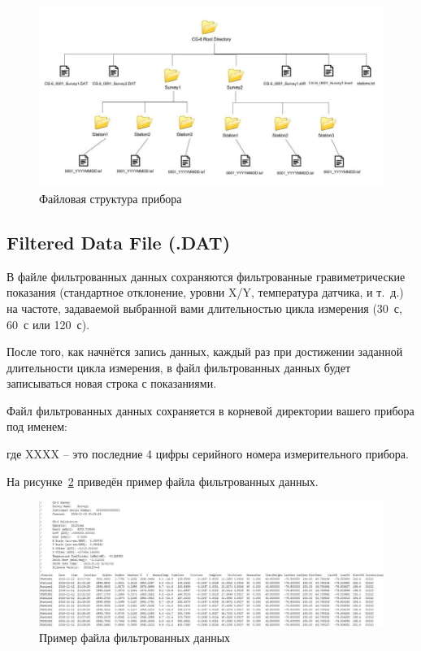 \begin{figure}[h]
  \centering
  \includegraphics[width=\textwidth]{figures/file_structure_of_a_cg6_autograv}
  \caption{Файловая структура прибора \cg{}}
  \label{fig:file_structure_of_a_cg6_autograv}
\end{figure}

\subsection{Filtered Data File (.DAT)}

В файле фильтрованных данных сохраняются фильтрованные гравиметрические
показания (стандартное отклонение, уровни X/Y, температура датчика, и т.~д.) на
частоте, задаваемой выбранной вами длительностью цикла измерения (30~с, 60~с или
120~с).

После того, как начнётся запись данных, каждый раз при достижении заданной
длительности цикла измерения, в файл фильтрованных данных будет записываться
новая строка с показаниями.

Файл фильтрованных данных сохраняется в корневой директории вашего прибора
\cg{} под именем:


где XXXX – это последние 4 цифры серийного номера измерительного прибора.

На рисунке~\ref{fig:sample_filtered_data_file_from_a_cg6_autograv} приведён
пример файла фильтрованных данных.

\begin{figure}[h]
  \centering
  \includegraphics[width=\textwidth]{figures/sample_filtered_data_file_from_a_cg6_autograv}
  \caption{Пример файла фильтрованных данных \cg{}}
  \label{fig:sample_filtered_data_file_from_a_cg6_autograv}
\end{figure}

